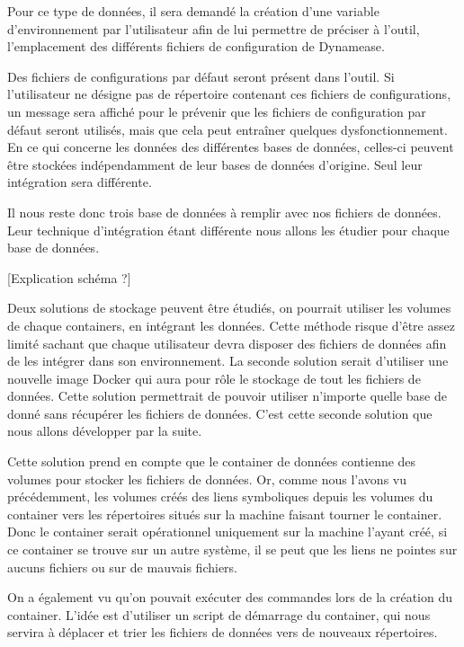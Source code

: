 Pour ce type de données, il sera demandé la création d'une variable d'environnement par l'utilisateur afin de lui permettre de préciser à l'outil, l'emplacement des différents fichiers de configuration de Dynamease. 

Des fichiers de configurations par défaut seront présent dans l'outil. Si l'utilisateur ne désigne pas de répertoire contenant ces fichiers de configurations, un message sera affiché pour le prévenir que les fichiers de configuration par défaut seront utilisés, mais que cela peut entraîner quelques dysfonctionnement.\\

En ce qui concerne les données des différentes bases de données, celles-ci peuvent être stockées indépendamment de leur bases de données d'origine. Seul leur intégration sera différente.

Il nous reste donc trois base de données à remplir avec nos fichiers de données. Leur technique d'intégration étant différente nous allons les étudier pour chaque base de données. 

[Explication schéma ?] 

Deux solutions de stockage peuvent être étudiés, on pourrait utiliser les volumes de chaque containers, en intégrant les données. Cette méthode risque d'être assez limité sachant que chaque utilisateur devra disposer des fichiers de données afin de les intégrer dans son environnement. La seconde solution serait d'utiliser une nouvelle image Docker qui aura pour rôle le stockage de tout les fichiers de données. Cette solution permettrait de pouvoir utiliser n'importe quelle base de donné sans récupérer les fichiers de données. C'est cette seconde solution que nous allons développer par la suite.

Cette solution prend en compte que le container de données contienne des volumes pour stocker les fichiers de données. Or, comme nous l'avons vu précédemment, les volumes créés des liens symboliques depuis les volumes du container vers les répertoires situés sur la machine faisant tourner le container. Donc le container serait opérationnel uniquement sur la machine l'ayant créé, si ce container se trouve sur un autre système, il se peut que les liens ne pointes sur aucuns fichiers ou sur de mauvais fichiers. 

On a également vu qu'on pouvait exécuter des commandes lors de la création du container. L'idée est d'utiliser un script de démarrage du container, qui nous servira à déplacer et trier les fichiers de données vers de nouveaux répertoires.

